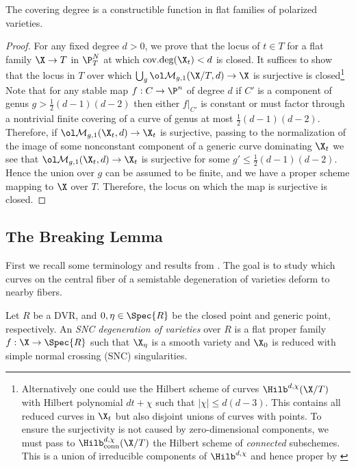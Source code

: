 \documentclass[12pt]{article}
\DeclareMathOperator{\covdeg}{\text{cov.deg}}
\begin{document}
\begin{lemma}[constructibility] \label{lemma:constructibility}
    The covering degree is a constructible function in flat families of polarized varieties.
\end{lemma}

\begin{proof}
    For any fixed degree $d > 0$, we prove that the locus of $t\in T$ for a flat family $\X \to T$ in $\P^N_T$ at which $\covdeg(\X_t) < d$ is closed. It suffices to show that the locus in $T$ over which $\bigcup_g \Mbar_{g,1}(\X/T, d) \to \X$ is surjective is closed\footnote{Alternatively one could use the Hilbert scheme of curves $\Hilb^{d,\chi}(\X/T)$ with Hilbert polynomial $d t + \chi$ such that $|\chi| \le d(d-3)$. This contains all reduced curves in $\X_t$ but also disjoint unions of curves with points. To ensure the surjectivity is not caused by zero-dimensional components, we must pass to $\Hilb^{d, \chi}_{\text{conn}}(\X/T)$ the Hilbert scheme of \textit{connected} subschemes.  This is a union of irreducible components of $\Hilb^{d,\chi}$ and hence proper by \cite[\href{https://stacks.math.columbia.edu/tag/0BUI}{Tag 0BUI}]{stacks}}
    Note that for any stable map $f : C \to \P^n$ of degree $d$ if $C'$ is a component of genus $g > \frac{1}{2}(d-1)(d-2)$ then either $f|_{C'}$ is constant or must factor through a nontrivial finite covering of a curve of genus at most $\frac{1}{2}(d-1)(d-2)$. Therefore, if $\Mbar_{g,1}(\X_t, d) \to \X_t$ is surjective, passing to the normalization of the image of some nonconstant component of a generic curve dominating $\X_t$ we see that $\Mbar_{g,1}(\X_t, d) \to \X_t$ is surjective for some $g' \le \frac{1}{2}(d-1)(d-2)$. Hence the union over $g$ can be assumed to be finite, and we have a proper scheme mapping to $\X$ over $T$. Therefore, the locus on which the map is surjective is closed. 
\end{proof}

\subsection{The Breaking Lemma}

First we recall some terminology and results from \cite{Li01}. The goal is to study which curves on the central fiber of a semistable degeneration of varieties deform to nearby fibers. 

\begin{defn}
Let $R$ be a DVR, and $0,\eta \in \Spec{R}$ be the closed point and generic point, respectively. An \textit{SNC degeneration of varieties} over $R$ is a flat proper family $f : \X \to \Spec{R}$ such that $\X_\eta$ is a smooth variety and $\X_0$ is reduced with simple normal crossing (SNC) singularities.
\end{defn}
\end{document}
